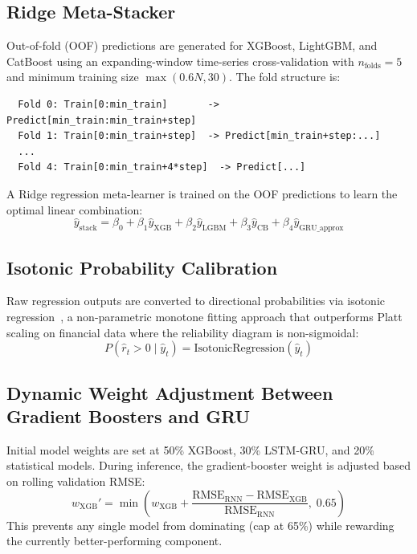 \documentclass[10pt,a4paper,twoside]{article}
\begin{document}
\subsection{Ridge Meta-Stacker}

Out-of-fold (OOF) predictions are generated for XGBoost, LightGBM, and CatBoost
using an expanding-window time-series cross-validation with $n_{\text{folds}}=5$
and minimum training size $\max(0.6N, 30)$. The fold structure is:
{\small
\begin{verbatim}
  Fold 0: Train[0:min_train]       -> Predict[min_train:min_train+step]
  Fold 1: Train[0:min_train+step]  -> Predict[min_train+step:...]
  ...
  Fold 4: Train[0:min_train+4*step]  -> Predict[...]
\end{verbatim}
}

A Ridge regression meta-learner is trained on the OOF predictions to learn the
optimal linear combination:
\begin{equation}
  \hat{y}_{\text{stack}} = \beta_0 + \beta_1 \hat{y}_{\text{XGB}}
  + \beta_2 \hat{y}_{\text{LGBM}} + \beta_3 \hat{y}_{\text{CB}}
  + \beta_4 \hat{y}_{\text{GRU\_approx}}
\end{equation}

\subsection{Isotonic Probability Calibration}

Raw regression outputs are converted to directional probabilities via isotonic
regression~\cite{zadrozny2002}, a non-parametric monotone fitting approach
that outperforms Platt scaling on financial data where the reliability diagram
is non-sigmoidal:
\begin{equation}
  P(\hat{r}_t > 0 \mid \hat{y}_t) = \text{IsotonicRegression}(\hat{y}_t)
\end{equation}

\subsection{Dynamic Weight Adjustment Between Gradient Boosters and GRU}

Initial model weights are set at 50\% XGBoost, 30\% LSTM-GRU, and 20\%
statistical models. During inference, the gradient-booster weight is adjusted
based on rolling validation RMSE:
\begin{equation}
  w_{\text{XGB}}' = \min\!\left(w_{\text{XGB}}
  + \frac{\text{RMSE}_{\text{RNN}} - \text{RMSE}_{\text{XGB}}}
         {\text{RMSE}_{\text{RNN}}},\; 0.65\right)
\end{equation}
This prevents any single model from dominating (cap at 65\%) while rewarding
the currently better-performing component.
\end{document}
